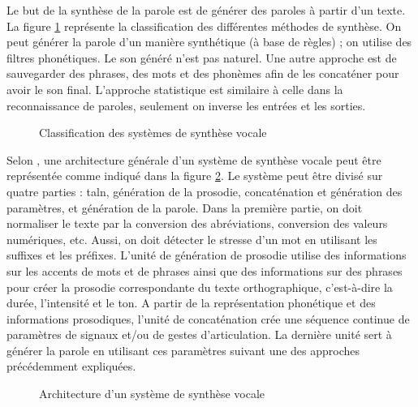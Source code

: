 \documentclass{KodeBook}
\begin{document}
Le but de la synthèse de la parole est de générer des paroles à partir d'un texte. 
La figure \ref{fig:tts-classif} représente la classification des différentes méthodes de synthèse. 
On peut générer la parole d'un manière synthétique (à base de règles) ; on utilise des filtres phonétiques. 
Le son généré n'est pas naturel. 
Une autre approche est de sauvegarder des phrases, des mots et des phonèmes afin de les concaténer pour avoir le son final. 
L'approche statistique est similaire à celle dans la reconnaissance de paroles, seulement on inverse les entrées et les sorties. 

\begin{figure}[!ht]
	\centering
	\caption{Classification des systèmes de synthèse vocale}
	\label{fig:tts-classif}
\end{figure}

Selon \cite{2017-Hinterleitner}, une architecture générale d'un système de synthèse vocale peut être représentée comme indiqué dans la figure \ref{fig:tts-arch}. 
Le système peut être divisé sur quatre parties : \ac{taln}, génération de la prosodie, concaténation et génération des paramètres, et génération de la parole. 
Dans la première partie, on doit  normaliser le texte par la conversion des abréviations, conversion des valeurs numériques, etc. 
Aussi, on doit détecter le stresse d'un mot en utilisant les suffixes et les préfixes. 
L'unité de génération de prosodie utilise des informations sur les accents de mots et de phrases ainsi que des informations sur des phrases pour créer la prosodie correspondante du texte orthographique, c'est-à-dire la durée, l'intensité et le ton.
A partir de la représentation phonétique et des informations prosodiques, l'unité de concaténation crée une séquence continue de paramètres de signaux et/ou de gestes d'articulation.
La dernière unité sert à générer la parole en utilisant ces paramètres suivant une des approches précédemment expliquées.

\begin{figure}[!ht]
	\centering
	\caption{Architecture d'un système de synthèse vocale \cite{2017-Hinterleitner}}
	\label{fig:tts-arch}
\end{figure}
\end{document}
